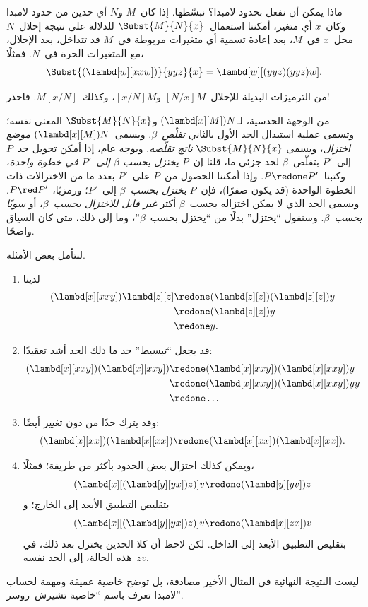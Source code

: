 \documentclass[../../../include/open-logic-section]{subfiles}
\begin{document}

ماذا يمكن أن نفعل بحدود لامبدا؟ نبسّطها. إذا كان~$M$ و$N$ أي حدين من
حدود لامبدا وكان~$x$ أي متغير، أمكننا استعمال~$\Subst{M}{N}{x}$ للدلالة
على نتيجة إحلال~$N$ محل~$x$ في~$M$، بعد إعادة تسمية أي متغيرات مربوطة
في~$M$ قد تتداخل، بعد الإحلال، مع المتغيرات الحرة في~$N$. فمثلًا،
\[
\Subst{(\lambd[w][xxw])}{yyz}{x} = \lambd[w][(yyz)(yyz)w].
\]

\begin{digress}
من الترميزات البديلة للإحلال~$[N/x]M$ و$[x/N]M$، وكذلك~$M[x/N]$.
فاحذر!
\end{digress}

من الوجهة الحدسية، لـ$(\lambd[x][M])N$ و$\Subst{M}{N}{x}$ المعنى نفسه؛
وتسمى عملية استبدال الحد الأول بالثاني \emph{تقلّص~$\beta$}.
ويسمى~$(\lambd[x][M])N$ \emph{موضع اختزال}، ويسمى
$\Subst{M}{N}{x}$ \emph{ناتج تقلّصه}. وبوجه عام، إذا أمكن تحويل حد~$P$
إلى~$P'$ بتقلّص~$\beta$ لحد جزئي ما، قلنا إن~$P$ \emph{يختزل بحسب
$\beta$ إلى~$P'$ في خطوة واحدة}، وكتبنا~$P \redone P'$. وإذا أمكننا
الحصول من~$P$ على~$P'$ بعدد ما من الاختزالات ذات الخطوة الواحدة (قد
يكون صفرًا)، فإن~$P$ \emph{يختزل بحسب~$\beta$} إلى~$P'$؛ ورمزيًا،
$P \red P'$. ويسمى الحد الذي لا يمكن اختزاله بحسب~$\beta$ أكثر
\emph{غير قابل للاختزال بحسب~$\beta$}، أو \emph{سويًا بحسب~$\beta$}.
وسنقول ``يختزل'' بدلًا من ``يختزل بحسب~$\beta$''، وما إلى ذلك، متى كان
السياق واضحًا.

لنتأمل بعض الأمثلة.
\begin{enumerate}
\item لدينا
\begin{align*}
(\lambd[x][xxy]) \lambd[z][z] & \redone (\lambd[z][z])(\lambd[z][z]) y \\
& \redone (\lambd[z][z]) y \\
& \redone y.
\end{align*}
\item قد يجعل ``تبسيط'' حد ما ذلك الحد أشد تعقيدًا:
\begin{align*}
(\lambd[x][xxy])(\lambd[x][xxy]) & \redone (\lambd[x][xxy])(\lambd[x][xxy])y \\
& \redone (\lambd[x][xxy])(\lambd[x][xxy])yy \\
& \redone \dots
\end{align*}
\item وقد يترك حدًا من دون تغيير أيضًا:
\[
(\lambd[x][xx])(\lambd[x][xx]) \redone (\lambd[x][xx])(\lambd[x][xx]).
\]
\item ويمكن كذلك اختزال بعض الحدود بأكثر من طريقة؛ فمثلًا،
\[
(\lambd[x][(\lambd[y][yx]) z)] v \redone (\lambd[y][yv]) z
\]
بتقليص التطبيق الأبعد إلى الخارج؛ و
\[
(\lambd[x][(\lambd[y][yx]) z)] v \redone (\lambd[x][zx]) v
\]
بتقليص التطبيق الأبعد إلى الداخل. لكن لاحظ أن كلا الحدين يختزل بعد ذلك،
في هذه الحالة، إلى الحد نفسه~$zv$.
\end{enumerate}

ليست النتيجة النهائية في المثال الأخير مصادفة، بل توضح خاصية عميقة
ومهمة لحساب لامبدا تعرف باسم ``خاصية تشيرش--روسر''.
\end{document}
